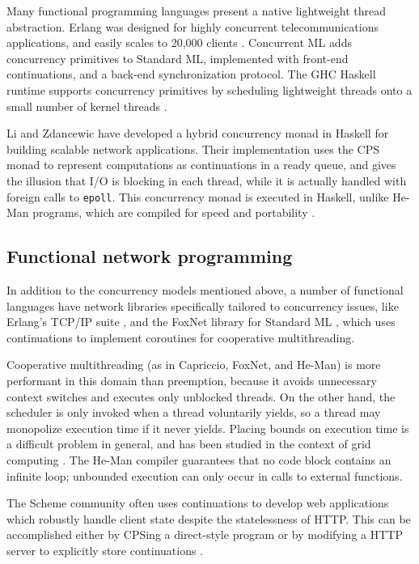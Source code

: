 \documentclass[preprint]{sigplanconf}
\renewcommand{\t}{\texttt}
\begin{document}
Many functional programming languages present a native lightweight thread
abstraction. Erlang \cite{VirdingEtAl} was designed for highly concurrent
telecommunications applications, and easily scales to 20,000 clients
\cite{Hellstrom}. Concurrent ML \cite{ReppyEtAl} adds concurrency primitives to
Standard ML, implemented with front-end continuations, and a back-end
synchronization protocol. The GHC Haskell runtime supports concurrency
primitives \cite{LiEtAl} by scheduling lightweight threads onto a small number
of kernel threads \cite{MarlowEtAl}.

Li and Zdancewic \cite{LiZdancewic} have developed a hybrid concurrency monad in
Haskell for building scalable network applications. Their implementation uses
the CPS monad to represent computations as continuations in a ready queue, and
gives the illusion that I/O is blocking in each thread, while it is actually
handled with foreign calls to \t{epoll}. This concurrency monad is executed in
Haskell, unlike He-Man programs, which are compiled for speed and portability
\cite{ElliottEtAl}.

\subsection{Functional network programming}

In addition to the concurrency models mentioned above, a number of functional
languages have network libraries specifically tailored to concurrency issues,
like Erlang's TCP/IP suite \cite{ParisEtAl}, and the FoxNet library for Standard
ML \cite{BiagioniEtAl}, which uses continuations to implement coroutines for
cooperative multithreading.

Cooperative multithreading (as in Capriccio, FoxNet, and He-Man) is more
performant in this domain than preemption, because it avoids unnecessary context
switches and executes only unblocked threads. On the other hand, the scheduler
is only invoked when a thread voluntarily yields, so a thread may monopolize
execution time if it never yields. Placing bounds on execution time is a
difficult problem in general, and has been studied in the context of grid
computing \cite{VanderwaartCrary}. The He-Man compiler guarantees that no code
block contains an infinite loop; unbounded execution can only occur in calls to
external functions.

The Scheme community often uses continuations to develop web applications which
robustly handle client state despite the statelessness of HTTP. This can be
accomplished either by CPSing a direct-style program \cite{GraunkeEtAl} or by
modifying a HTTP server to explicitly store continuations \cite{Queinnec}.
\end{document}

